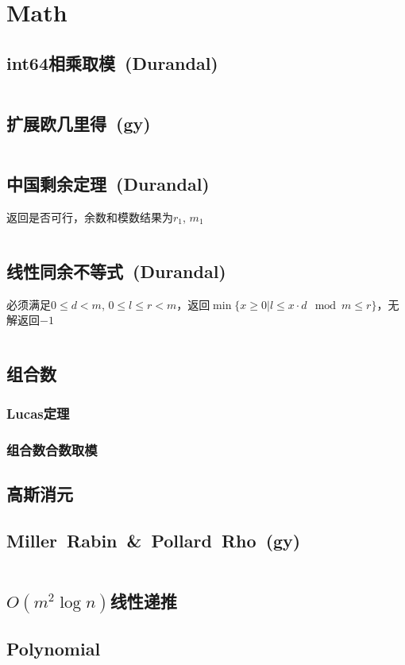 \chapter{Math}
\section{int64相乘取模\ \small(Durandal)}
\inputminted{cpp}{Math/int64_multiply_mod.cpp}
\section{扩展欧几里得\ \small(gy)}
\inputminted{cpp}{Math/extend_gcd.cpp}
\section{中国剩余定理\ \small(Durandal)}
返回是否可行，余数和模数结果为$ r_1 $, $ m_1 $
\inputminted{cpp}{Math/chinese_remainder_theorem.cpp}
\section{线性同余不等式\ \small(Durandal)}
必须满足$ 0 \leq d < m $, $ 0 \leq l \leq r < m $，返回$ \min\lbrace x \geq 0 | l \leq x \cdot d \mod m \leq r \rbrace $，无解返回$ -1 $ 
\inputminted{cpp}{Math/linear_congruence_inequality.cpp}
\section{组合数}
\subsection{Lucas定理}
\subsection{组合数合数取模}
\section{高斯消元}
\section{Miller\ Rabin\ \&\ Pollard\ Rho\ \small(gy)}
\inputminted{cpp}{Math/miller_rabin_and_pollard_rho.cpp}
\section{$ O(m ^ 2 \log n) $线性递推}
\section{Polynomial}
